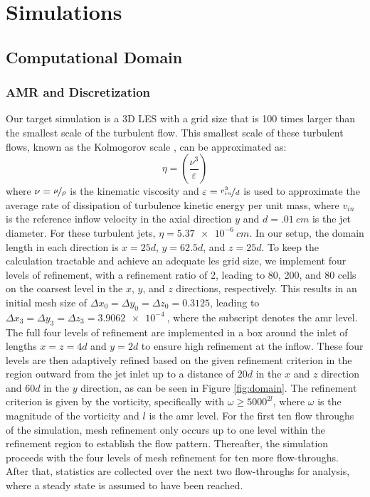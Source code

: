 \chapter{Simulations}


\section{Computational Domain}
\subsection{AMR and Discretization}
Our target simulation is a 3D LES with a grid size that is 100 times larger than the smallest scale of the turbulent flow. This smallest scale of these turbulent flows, known as the Kolmogorov scale \cite{kolmogorov}, can be approximated as:
\begin{equation} \label{Kolmogorov}
	\eta = \left( \dfrac{\nu^3}{\varepsilon} \right)
\end{equation}
where $\nu = \nicefrac{\mu}{\rho}$ is the kinematic viscosity and $\varepsilon = \nicefrac{v_{in}^3}{d}$ is used to approximate the average rate of dissipation of turbulence kinetic energy per unit mass, where $v_{in}$ is the reference inflow velocity in the axial direction $y$ and $d=\SI{.01}{cm}$ is the jet diameter. For these turbulent jets, $\eta = \SI{5.37e-6}{cm}$. In our setup, the domain length in each direction is $x = 25d$, $y = 62.5d$, and $z = 25d$. To keep the calculation tractable \cite{} and achieve an adequate \gls{les} grid size, we implement four levels of refinement, with a refinement ratio of 2, leading to 80, 200, and 80 cells on the coarsest level in the $x$, $y$, and $z$ directions, respectively. This results in an initial mesh size of $\Delta x_{0}=\Delta y_{0}=\Delta z_{0}=0.3125$, leading to $\Delta x_{3}=\Delta y_{3}=\Delta z_{3}=\SI{3.9062e-4}{}$, where the subscript denotes the \gls{amr} level. The full four levels of refinement are implemented in a box around the inlet of lengths $x=z=4d$ and $y=2d$ to ensure high refinement at the inflow. These four levels are then adaptively refined based on the given refinement criterion in the region outward from the jet inlet up to a distance of $20d$ in the $x$ and $z$ direction and $60d$ in the $y$ direction, as can be seen in Figure \ref{fig:domain}. The refinement criterion is given by the vorticity, specifically with $\omega \geq 5000^{2l}$, where $\omega$ is the magnitude of the vorticity and $l$ is the \gls{amr} level. For the first ten flow throughs of the simulation, mesh refinement only occurs up to one level within the refinement region to establish the flow pattern. Thereafter, the simulation proceeds with the four levels of mesh refinement for ten more flow-throughs. After that, statistics are collected over the next two flow-throughs for analysis, where a steady state is assumed to have been reached.
